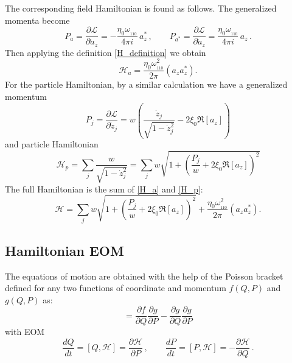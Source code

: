 \documentclass[11pt]{article}
\newcommand{\LL}{\mathcal{L}}
\newcommand{\HH}{\mathcal{H}}
\begin{document}
The corresponding field Hamiltonian is found as follows. The generalized momenta become
%
\begin{equation}
P_a = \frac{\partial \LL}{\partial \dot{a}_z} = - \frac{\eta_0 \omega_{_{110}}}{4\pi i}\, a_z^*\, , \qquad
P_{a^*} = \frac{\partial \LL}{\partial \dot{a}_z} =  \frac{\eta_0 \omega_{_{110}}}{4\pi i}\, a_z\, .
\label{p_a}
\end{equation}
%
Then applying the definition \eqref{H_definition} we obtain
\begin{equation}
\HH_a = \frac{\eta_0\omega_{_{110}}^2}{2\pi}\left( a_z a_z^* \right).
\label{H_a}
\end{equation}
%
For the particle Hamiltonian, by a similar calculation we have a generalized momentum
%
\begin{equation}
P_j = \frac{\partial \LL}{\partial \dot{z}_j} = w\left(\frac{\dot{z}_j}{\sqrt{1-\dot{z}_j^2}} 
- 2\xi_0\Re[a_z] \right)
\label{p_j_definition}
\end{equation}
%
and particle Hamiltonian
%
\begin{equation}
\HH_p = \sum_j\frac{w}{\sqrt{1-\dot{z}_j^2}}
= \sum_j w \sqrt{1 + \left(\frac{P_j}{w} + 2\xi_0\Re[a_z] \right)^2}
\label{H_p}
\end{equation}
%
The full Hamiltonian is the sum of \eqref{H_a} and \eqref{H_p}:
%
\begin{equation}
\HH = \sum_j w \sqrt{1 + \left(\frac{P_j}{w} + 2\xi_0\Re[a_z] \right)^2}
+ \frac{\eta_0\omega_{_{110}}^2}{2\pi}\left( a_z a_z^* \right).
\label{H}
\end{equation}
%

\subsection{Hamiltonian EOM}
\label{Hamiltonian_EOM}


The equations of motion are obtained with the help of the Poisson bracket
defined for any two functions of coordinate and momentum $f(Q,P)$ and $g(Q,P)$ as:
%
\begin{equation}
[f,g] = \frac{\partial f}{\partial Q}\frac{\partial g}{\partial P} 
- \frac{\partial g}{\partial Q}\frac{\partial g}{\partial P}
\label{Poisson_bracket}
\end{equation}
%
with EOM
%
\begin{equation}
\frac{d Q}{d t} = [Q,\HH] = \frac{\partial \HH}{\partial P}\, , \qquad 
\frac{d P}{d t} = [P,\HH] = - \frac{\partial \HH}{\partial Q}\, .
\label{Hamiltonian_EOM}
\end{equation}
%
\end{document}
